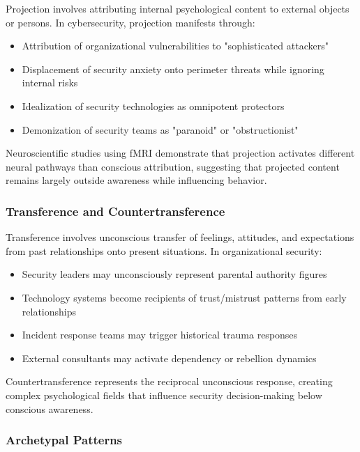 \documentclass[11pt,a4paper]{article}
\begin{document}
Projection involves attributing internal psychological content to external objects or persons. In cybersecurity, projection manifests through:

\begin{itemize}
\item Attribution of organizational vulnerabilities to "sophisticated attackers"
\item Displacement of security anxiety onto perimeter threats while ignoring internal risks
\item Idealization of security technologies as omnipotent protectors
\item Demonization of security teams as "paranoid" or "obstructionist"
\end{itemize}

Neuroscientific studies using fMRI demonstrate that projection activates different neural pathways than conscious attribution, suggesting that projected content remains largely outside awareness while influencing behavior\cite{beer2010}.

\subsubsection{Transference and Countertransference}

Transference involves unconscious transfer of feelings, attitudes, and expectations from past relationships onto present situations. In organizational security:

\begin{itemize}
\item Security leaders may unconsciously represent parental authority figures
\item Technology systems become recipients of trust/mistrust patterns from early relationships
\item Incident response teams may trigger historical trauma responses
\item External consultants may activate dependency or rebellion dynamics
\end{itemize}

Countertransference represents the reciprocal unconscious response, creating complex psychological fields that influence security decision-making below conscious awareness\cite{kernberg1998}.

\subsubsection{Archetypal Patterns}
\end{document}
